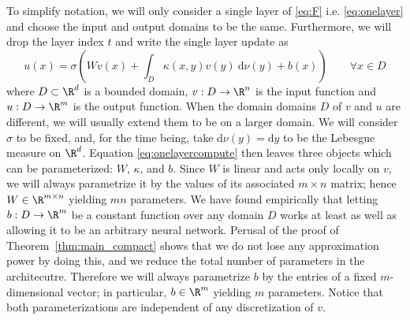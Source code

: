 To simplify notation, we will only consider a single layer of \eqref{eq:F} i.e. \eqref{eq:onelayer} and choose the input and output domains to be the same. Furthermore, we will drop the layer index \(t\) and write the single layer update as
\begin{equation}
    \label{eq:onelayercompute}
    u(x) = \sigma \left ( W v(x) + \int_D \kappa (x,y) v(y) \: \text{d}\nu(y) + b(x) \right ) \qquad \forall x \in D
\end{equation}
where \(D \subset \R^d\) is a bounded domain, \(v: D \to \R^n\) is the input function and \(u: D \to \R^m\) is the output function. 
When the domain domains $D$ of $v$ and $u$ are different, we will usually extend them to be on a larger domain.  
We will consider \(\sigma\) to be fixed, and, for the time being, take \(\text{d} \nu(y) = \text{d} y\) to be the Lebesgue measure on \(\R^d\). Equation \eqref{eq:onelayercompute} then leaves three objects which can be parameterized: \(W\), \(\kappa\), and \(b\). Since \(W\) is linear and acts only locally on \(v\), we will always parametrize it by the values of its associated \(m \times n\) matrix; hence \(W \in \R^{m \times n}\) yielding \(mn\) parameters. 
We have found empirically that letting \(b: D \to \R^m\) be a constant function over any domain \(D\) works at least as well as allowing it to be an arbitrary neural network. Perusal of the proof of Theorem~\ref{thm:main_compact} shows that we do not lose any approximation power by doing this, and we reduce the total number of parameters in the architecutre. Therefore we will always parametrize \(b\) by the entries of a fixed \(m\)-dimensional vector; in particular, \(b \in \R^m\) yielding \(m\) parameters. Notice that both parameterizations are independent of any discretization of \(v\). 


